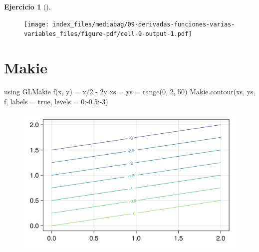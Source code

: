 \documentclass[
  a4paper,
]{scrreport}
\newenvironment{Shaded}{\begin{snugshade}}{\end{snugshade}}
\newcommand{\BuiltInTok}[1]{\textcolor[rgb]{0.00,0.23,0.31}{#1}}
\newcommand{\ConstantTok}[1]{\textcolor[rgb]{0.56,0.35,0.01}{#1}}
\newcommand{\FloatTok}[1]{\textcolor[rgb]{0.68,0.00,0.00}{#1}}
\newcommand{\FunctionTok}[1]{\textcolor[rgb]{0.28,0.35,0.67}{#1}}
\newcommand{\ImportTok}[1]{\textcolor[rgb]{0.00,0.46,0.62}{#1}}
\newcommand{\NormalTok}[1]{\textcolor[rgb]{0.00,0.23,0.31}{#1}}
\newcommand{\OperatorTok}[1]{\textcolor[rgb]{0.37,0.37,0.37}{#1}}
\theoremstyle{definition}
\newtheorem{exercise}{Ejercicio}[chapter]
\theoremstyle{remark}
\begin{document}
\begin{exercise}[]
\begin{enumerate}
\begin{tcolorbox}
  \begin{figure}[H]

  {\centering \texttt{[image: index\_files/mediabag/09-derivadas-funciones-varias-variables\_files/figure-pdf/cell-9-output-1.pdf]}

  }

  \end{figure}

  \section{Makie}

\begin{Shaded}
\begin{Highlighting}[]
\ImportTok{using} \BuiltInTok{GLMakie}
\FunctionTok{f}\NormalTok{(x, y) }\OperatorTok{=}\NormalTok{ x}\OperatorTok{/}\FloatTok{2} \OperatorTok{{-}} \FloatTok{2}\NormalTok{y}
\NormalTok{xs }\OperatorTok{=}\NormalTok{ ys }\OperatorTok{=} \FunctionTok{range}\NormalTok{(}\FloatTok{0}\NormalTok{, }\FloatTok{2}\NormalTok{, }\FloatTok{50}\NormalTok{)}
\NormalTok{Makie.}\FunctionTok{contour}\NormalTok{(xs, ys, f, labels }\OperatorTok{=} \ConstantTok{true}\NormalTok{,  levels }\OperatorTok{=} \FloatTok{0}\OperatorTok{:{-}}\FloatTok{0.5}\OperatorTok{:{-}}\FloatTok{3}\NormalTok{)}
\end{Highlighting}
\end{Shaded}

  \begin{figure}[H]

  {\centering \includegraphics{09-derivadas-funciones-varias-variables_files/figure-pdf/cell-10-output-1.png}

  }

  \end{figure}


\end{tcolorbox}
\end{enumerate}
\end{exercise}
\end{document}
